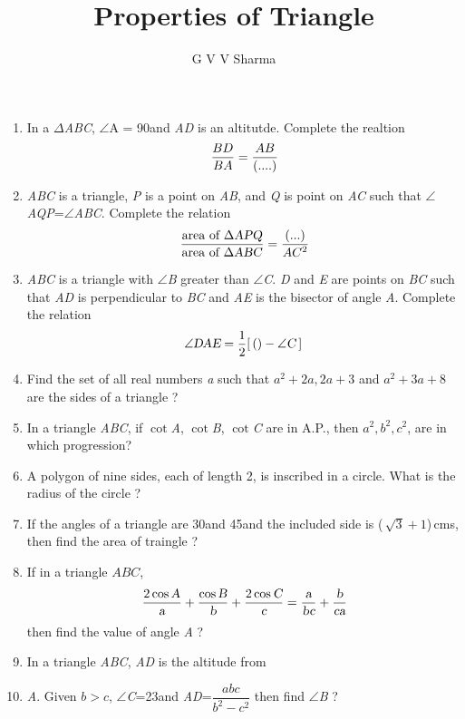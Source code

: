 \documentclass[journal,12pt,twocolumn]{IEEEtran}
\begin{document}
\title{Properties of Triangle}
\author{G V V Sharma}
\maketitle
\begin{enumerate}
 \item In a $\Delta$\textsl{ABC}, $\angle$A = 90\degree and \textsl{AD} is an altitutde. Complete the realtion
 \[\frac{\textsl{$BD$}}{\textsl{$BA$}} = \frac{\textsl{$AB$}}{(....)}\]
 \item \textsl{ABC} is a triangle, \textsl{P} is a point on \textsl{AB}, and \textsl{Q} is point on \textsl{AC} such that $\angle$\textsl{AQP}=$\angle$\textsl{ABC}. Complete the relation
 \[\frac{\mbox{area of $\Delta$\textsl{APQ}}}{\mbox{area of $\Delta$\textsl{ABC}}}=\frac{(...)}{\textsl{$AC^2$}}\]
 \item \textsl{ABC} is a triangle with $\angle$\textsl{B} greater than $\angle$\textsl{C}. \textsl{D} and \textsl{E} are points on \textsl{BC} such that \textsl{AD} is perpendicular to \textsl{BC} and \textsl{AE} is the bisector of angle \textsl{A}. Complete the relation
 \begin{equation*}
 \angle\textsl{DAE}
 =\frac{1}{2}[\,( )-\angle\textsl{C}\:]\,
 \end{equation*}
 \item Find the set of all real numbers \textsl{a} such that \textsl{$a^2+2a, 2a+3$} and \textsl{$a^2+3a+8$} are the sides of a triangle ?
 \item In a triangle \textsl{ABC}, if $\cot$\textsl{A},
$\cot$\textsl{B}, $\cot$\textsl{C} are in A.P., then \textsl{$a^2, b^2, c^2$}, are in which progression?
 \item A polygon of nine sides, each of length 2, is inscribed in a circle. What is the radius of the circle ?
 \item If the angles of a triangle are 30\degree and 45\degree and the included side is (\,$\sqrt{3}+1$)\,cms, then find the area of traingle ?
 \item If in a triangle \textsl{$ABC$}, \begingroup
 \normalsize
 \begin{equation*}
 \frac{2\cos\textsl{A}}{\textsl{a}}+\frac{\cos\textsl{B}}{\textsl{b}}+\frac{2\cos\textsl{C}}{\textsl{c}}=\frac{\textsl{a}}{\textsl{bc}}+\frac{\textsl{b}}{\textsl{ca}}
 \end{equation*}
 \endgroup then find the value of angle \textsl{A} ?
 \item In a triangle \textsl{ABC}, \textsl{AD} is the altitude from \item[~] \textsl{A}. Given \textsl{$b>c$}, \textsl{$\angle$C}=23\degree and \textsl{AD}=$\dfrac{abc}{b^2-c^2}$ then find $\angle$\textsl{B} ?

\end{enumerate}
\end{document}
